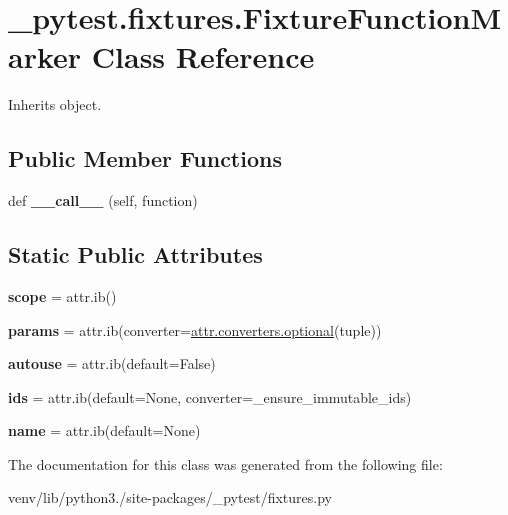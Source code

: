 \hypertarget{class__pytest_1_1fixtures_1_1_fixture_function_marker}{}\section{\+\_\+pytest.\+fixtures.\+Fixture\+Function\+Marker Class Reference}
\label{class__pytest_1_1fixtures_1_1_fixture_function_marker}


Inherits object.

\subsection*{Public Member Functions}
\begin{DoxyCompactItemize}
\item 
\mbox{\label{class__pytest_1_1fixtures_1_1_fixture_function_marker_aae6ed4408989e9c2bfa60930804dd82a}} 
def {\bfseries \+\_\+\+\_\+call\+\_\+\+\_\+} (self, function)
\end{DoxyCompactItemize}
\subsection*{Static Public Attributes}
\begin{DoxyCompactItemize}
\item 
\mbox{\label{class__pytest_1_1fixtures_1_1_fixture_function_marker_af9125eb7388c2d66318403b6276b3552}} 
{\bfseries scope} = attr.\+ib()
\item 
\mbox{\label{class__pytest_1_1fixtures_1_1_fixture_function_marker_a026bd5cb2b0763db30e1eb347779ec01}} 
{\bfseries params} = attr.\+ib(converter=\hyperlink{namespaceattr_1_1converters_a9573ca901d271a4af620f1d12ee9c63c}{attr.\+converters.\+optional}(tuple))
\item 
\mbox{\label{class__pytest_1_1fixtures_1_1_fixture_function_marker_ad358c8a05faad4a12e91ed64b73df224}} 
{\bfseries autouse} = attr.\+ib(default=False)
\item 
\mbox{\label{class__pytest_1_1fixtures_1_1_fixture_function_marker_a42fa226405ea928eddb367ef26b0bdb9}} 
{\bfseries ids} = attr.\+ib(default=None, converter=\+\_\+ensure\+\_\+immutable\+\_\+ids)
\item 
\mbox{\label{class__pytest_1_1fixtures_1_1_fixture_function_marker_a91af4a9067269fe59f650a7ed5318bf9}} 
{\bfseries name} = attr.\+ib(default=None)
\end{DoxyCompactItemize}


The documentation for this class was generated from the following file\+:\begin{DoxyCompactItemize}
\item 
venv/lib/python3./site-\/packages/\+\_\+pytest/fixtures.\+py\end{DoxyCompactItemize}
